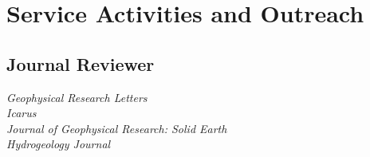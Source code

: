 \documentclass[11pt, letterpaper]{article}
\newcommand{\years}[1]{\marginnote{\scriptsize #1}}
\begin{document}
{{%

\section*{Service Activities and Outreach}

% 


\subsection*{Journal Reviewer}

	\textit{Geophysical Research Letters}\\
	\textit{Icarus}\\
	\textit{Journal of Geophysical Research: Solid Earth}\\
	\textit{Hydrogeology Journal}



}}
\end{document}
